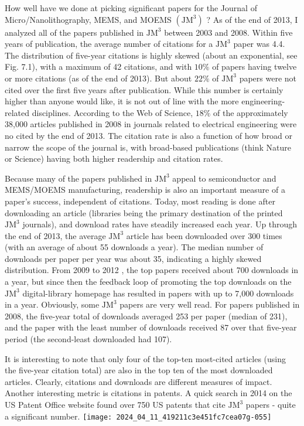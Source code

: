 How well have we done at picking significant papers for the Journal of Micro/Nanolithography, MEMS, and MOEMS $\left(\mathrm{JM}^{3}\right)$ ? As of the end of 2013, I analyzed all of the papers published in $\mathrm{JM}^{3}$ between 2003 and 2008. Within five years of publication, the average number of citations for a $\mathrm{JM}^{3}$ paper was 4.4. The distribution of five-year citations is highly skewed (about an exponential, see Fig. 7.1), with a maximum of 42 citations, and with $10 \%$ of papers having twelve or more citations (as of the end of 2013). But about $22 \%$ of $\mathrm{JM}^{3}$ papers were not cited over the first five years after publication. While this number is certainly higher than anyone would like, it is not out of line with the more engineering-related disciplines. According to the Web of Science, $18 \%$ of the approximately 38,000 articles published in 2008 in journals related to electrical engineering were no cited by the end of 2013. The citation rate is also a function of how broad or narrow the scope of the journal is, with broad-based publications (think Nature or Science) having both higher readership and citation rates.

Because many of the papers published in $\mathrm{JM}^{3}$ appeal to semiconductor and MEMS/MOEMS manufacturing, readership is also an important measure of a paper's success, independent of citations. Today, most reading is done after downloading an article (libraries being the primary destination of the printed $\mathrm{JM}^{3}$ journals), and download rates have steadily increased each year. Up through the end of 2013, the average $\mathrm{JM}^{3}$ article has been downloaded over 300 times (with an average of about 55 downloads a year). The median number of downloads per paper per year was about 35, indicating a highly skewed distribution. From 2009 to 2012 , the top papers received about 700 downloads in a year, but since then the feedback loop of promoting the top downloads on the $\mathrm{JM}^{3}$ digital-library homepage has resulted in papers with up to 7,000 downloads in a year. Obviously, some $\mathrm{JM}^{3}$ papers are very well read. For papers published in 2008, the five-year total of downloads averaged 253 per paper (median of 231), and the paper with the least number of downloads received 87 over that five-year period (the second-least downloaded had 107).

It is interesting to note that only four of the top-ten most-cited articles (using the five-year citation total) are also in the top ten of the most downloaded articles. Clearly, citations and downloads are different measures of impact. Another interesting metric is citations in patents. A quick search in 2014 on the US Patent Office website found over 750 US patents that cite $\mathrm{JM}^{3}$ papers - quite a significant number.
\texttt{[image: 2024\_04\_11\_419211c3e451fc7cea07g-055]}

